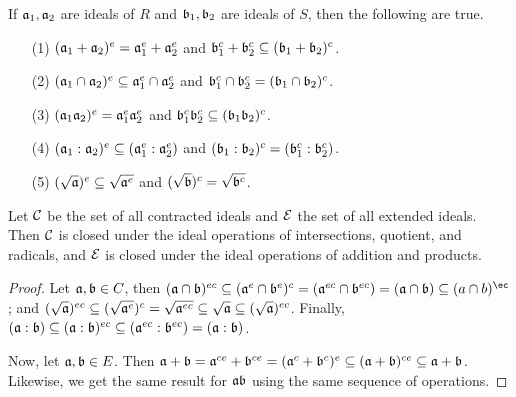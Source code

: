 \begin{proposition}\label{proposition_5.6.5}
    If $\af_1,\af_2$ are ideals of $R$ and  $\bf_1,\bf_2$ are ideals of $S$,
    then the following are true.
    \begin{enumerate}
        \item[(1)] $(\af_1+\af_2)^e=\af_1^e+\af_2^e$ and $\bf_1^c+\bf_2^c
            \subseteq (\bf_1+\bf_2)^c$.

        \item[(2)] $(\af_1 \cap \af_2)^e \subseteq \af_1^e \cap \af_2^e$ and
            $\bf_1^c \cap \bf_2^c=(\bf_1 \cap \bf_2)^c$.

        \item[(3)] $(\af_1\af_2)^e=\af_1^e\af_2^e$ and $\bf_1^c\bf_2^c
            \subseteq (\bf_1\bf_2)^c$.

        \item[(4)] $(\af_1:\af_2)^e \subseteq (\af_1^e:\af_2^e)$ and
            $(\bf_1:\bf_2)^c=(\bf_1^c:\bf_2^c)$.

        \item[(5)] $(\sqrt{\af})^e \subseteq \sqrt{\af^e}$ and
            $(\sqrt{\bf})^c=\sqrt{\bf^c}$.
    \end{enumerate}
\end{proposition}
\begin{corollary}
  Let $\Cc$ be the set of all contracted ideals and $\Ec$ the set of all extended
  ideals. Then $\Cc$ is closed under the ideal operations of intersections,
  quotient, and radicals, and $\Ec$ is closed under the ideal operations of
  addition and products.
\end{corollary}
\begin{proof}
  Let $\af,\bf \in C$, then $(\af \cap \bf)^{ec} \subseteq (\af^e \cap
  \bf^e)^c=(\af^{ec} \cap \bf^{ec})=(\af \cap \bf) \subseteq (a \cap b)^{\ec}$;
  and $(\sqrt{\af})^{ec} \subseteq (\sqrt{\af^e})^c=\sqrt{\af^{ec}} \subseteq
  \sqrt{\af} \subseteq (\sqrt{\af})^{ec}$. Finally, $(\af:\bf) \subseteq
  (\af:\bf)^{ec} \subseteq (\af^{ec}:\bf^{ec})=(\af:\bf)$.

  Now, let $\af, \bf \in E$. Then $\af+\bf=\af^{ce}+\bf^{ce}=(\af^c+\bf^c)^e
  \subseteq (\af+\bf)^{ce} \subseteq \af+\bf$. Likewise, we get the same result
  for $\af\bf$ using the same sequence of operations.
\end{proof}
